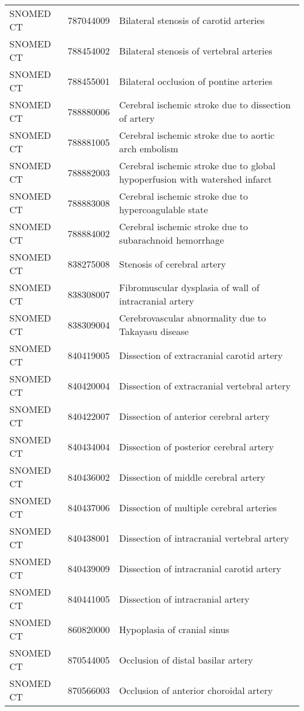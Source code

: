\begin{longtable}{p{}p{}p{}}
  SNOMED CT & 787044009 & Bilateral stenosis of carotid arteries \\ 
  SNOMED CT & 788454002 & Bilateral stenosis of vertebral arteries \\ 
  SNOMED CT & 788455001 & Bilateral occlusion of pontine arteries \\ 
  SNOMED CT & 788880006 & Cerebral ischemic stroke due to dissection of artery \\ 
  SNOMED CT & 788881005 & Cerebral ischemic stroke due to aortic arch embolism \\ 
  SNOMED CT & 788882003 & Cerebral ischemic stroke due to global hypoperfusion with watershed infarct \\ 
  SNOMED CT & 788883008 & Cerebral ischemic stroke due to hypercoagulable state \\ 
  SNOMED CT & 788884002 & Cerebral ischemic stroke due to subarachnoid hemorrhage \\ 
  SNOMED CT & 838275008 & Stenosis of cerebral artery \\ 
  SNOMED CT & 838308007 & Fibromuscular dysplasia of wall of intracranial artery \\ 
  SNOMED CT & 838309004 & Cerebrovascular abnormality due to Takayasu disease \\ 
  SNOMED CT & 840419005 & Dissection of extracranial carotid artery \\ 
  SNOMED CT & 840420004 & Dissection of extracranial vertebral artery \\ 
  SNOMED CT & 840422007 & Dissection of anterior cerebral artery \\ 
  SNOMED CT & 840434004 & Dissection of posterior cerebral artery \\ 
  SNOMED CT & 840436002 & Dissection of middle cerebral artery \\ 
  SNOMED CT & 840437006 & Dissection of multiple cerebral arteries \\ 
  SNOMED CT & 840438001 & Dissection of intracranial vertebral artery \\ 
  SNOMED CT & 840439009 & Dissection of intracranial carotid artery \\ 
  SNOMED CT & 840441005 & Dissection of intracranial artery \\ 
  SNOMED CT & 860820000 & Hypoplasia of cranial sinus \\ 
  SNOMED CT & 870544005 & Occlusion of distal basilar artery \\ 
  SNOMED CT & 870566003 & Occlusion of anterior choroidal artery \\ 

\end{longtable}

